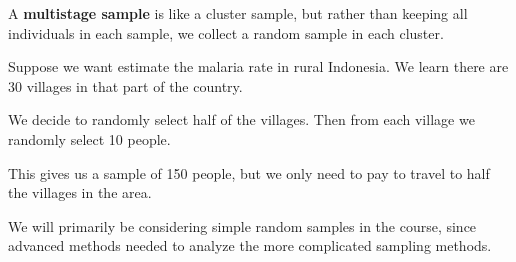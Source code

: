 \documentclass{beamer}
\begin{document}
\begin{frame}
\begin{definition}
A \textbf{multistage sample} is like a cluster sample, but rather than keeping all individuals in each sample, we collect a random sample in each cluster.
\end{definition}\pause

\begin{example}
Suppose we want estimate the malaria rate in rural Indonesia. We learn there are 30 villages in that part of the country.\pause

\vspace{2mm}
We decide to randomly select half of the villages. Then from each village we randomly select 10 people.\pause

\vspace{2mm} 
This gives us a sample of 150 people, but we only need to pay to travel to half the villages in the area.
\end{example}\pause

\begin{note}
We will primarily be considering simple random samples in the course, since advanced methods needed to analyze the more complicated sampling methods.
\end{note}
\end{frame}
\end{document}
